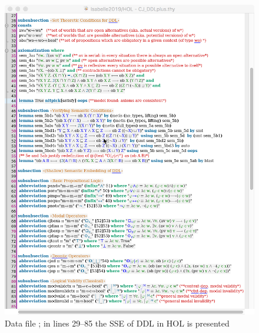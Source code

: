 \documentclass{article}
\begin{document}
\begin{figure}[ht!]
 \includegraphics[width=\textwidth]{CJ_DDLplus1.png}
\caption{Data file \textsf{\small {}; in
    lines 29--85 the SSE of DDL in HOL is presented \label{fig:CJ_DDLplus1}}}
\end{figure}
\end{document}
